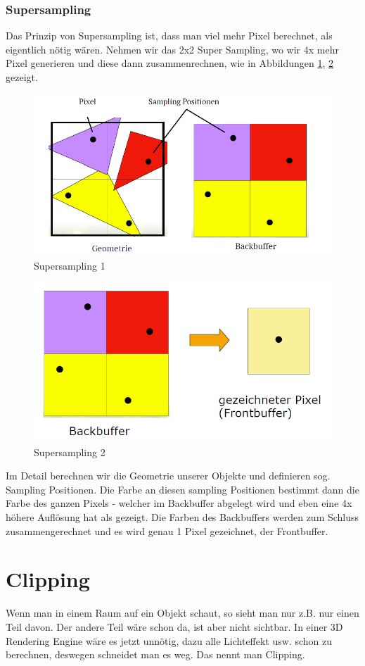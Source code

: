 \subsubsection{Supersampling}
Das Prinzip von Supersampling ist, dass man viel mehr Pixel berechnet, als eigentlich nötig wären. Nehmen wir das 2x2 Super Sampling, wo wir 4x mehr Pixel generieren und diese dann zusammenrechnen, wie in Abbildungen \ref{supersampling_1}, \ref{supersampling_2} gezeigt.
\begin{figure}[!ht]
	\centering
	\includegraphics[width=0.5\linewidth]{fig/supersampling_1}
	\caption{Supersampling 1}
	\label{supersampling_1}
\end{figure}
\begin{figure}[!ht]
	\centering
	\includegraphics[width=0.5\linewidth]{fig/supersampling_2}
	\caption{Supersampling 2}
	\label{supersampling_2}
\end{figure}
Im Detail berechnen wir die Geometrie unserer Objekte und definieren sog. Sampling Positionen. Die Farbe an diesen sampling Positionen bestimmt dann die Farbe des ganzen Pixels - welcher im Backbuffer abgelegt wird und eben eine 4x höhere Auflösung hat als gezeigt. Die Farben des Backbuffers werden zum Schluss zusammengerechnet und es wird genau 1 Pixel gezeichnet, der Frontbuffer.

\newpage
\section{Clipping}

Wenn man in einem Raum auf ein Objekt schaut, so sieht man nur z.B. nur einen Teil davon. Der andere Teil wäre schon da, ist aber nicht sichtbar. In einer 3D Rendering Engine wäre es jetzt unnötig, dazu alle Lichteffekt usw. schon zu berechnen, deswegen schneidet man es weg. Das nennt man Clipping.

